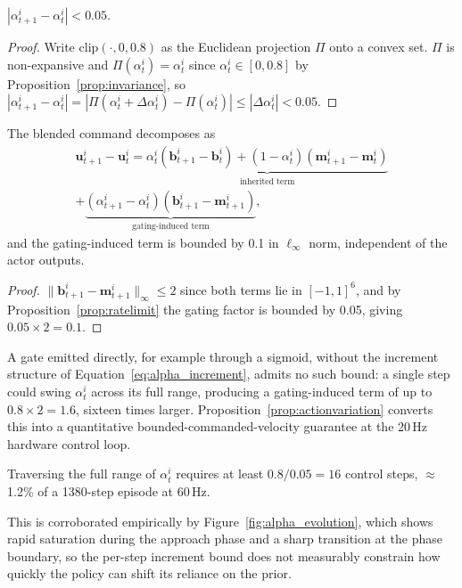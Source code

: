 \begin{proposition}\label{prop:ratelimit}
$|\alpha_{t+1}^i - \alpha_t^i| < 0.05$.
\end{proposition}
\begin{proof}
Write $\mathrm{clip}(\cdot,0,0.8)$ as the Euclidean projection $\Pi$ onto a convex set. $\Pi$ is
non-expansive and $\Pi(\alpha_t^i) = \alpha_t^i$ since $\alpha_t^i \in [0,0.8]$ by
Proposition~\ref{prop:invariance}, so $|\alpha_{t+1}^i - \alpha_t^i| = |\Pi(\alpha_t^i + \Delta\alpha_t^i) -
\Pi(\alpha_t^i)| \le |\Delta\alpha_t^i| < 0.05$.
\end{proof}

\begin{proposition}\label{prop:actionvariation}
The blended command decomposes as
\begin{multline}
\mathbf{u}_{t+1}^i - \mathbf{u}_t^i = \underbrace{\alpha_t^i(\mathbf{b}_{t+1}^i - \mathbf{b}_t^i) + (1-\alpha_t^i)(\mathbf{m}_{t+1}^i - \mathbf{m}_t^i)}_{\text{inherited term}} \\
+ \underbrace{(\alpha_{t+1}^i - \alpha_t^i)(\mathbf{b}_{t+1}^i - \mathbf{m}_{t+1}^i)}_{\text{gating-induced term}},
\label{eq:alpha_decomposition}
\end{multline}
and the gating-induced term is bounded by 0.1 in $\ell_\infty$ norm, independent of the actor outputs.
\end{proposition}
\begin{proof}
$\|\mathbf{b}_{t+1}^i - \mathbf{m}_{t+1}^i\|_\infty \le 2$ since both terms lie in $[-1,1]^6$, and by
Proposition~\ref{prop:ratelimit} the gating factor is bounded by 0.05, giving $0.05 \times 2 = 0.1$.
\end{proof}

A gate emitted directly, for example through a sigmoid, without the increment structure of
Equation~\eqref{eq:alpha_increment}, admits no such bound: a single step could swing $\alpha_t^i$ across its
full range, producing a gating-induced term of up to $0.8 \times 2 = 1.6$, sixteen times larger.
Proposition~\ref{prop:actionvariation} converts this into a quantitative bounded-commanded-velocity
guarantee at the 20\,Hz hardware control loop.

\begin{proposition}\label{prop:nonrestrictive}
Traversing the full range of $\alpha_t^i$ requires at least $0.8/0.05 = 16$ control steps,
$\approx$1.2\% of a 1380-step episode at 60\,Hz.
\end{proposition}
This is corroborated empirically by Figure~\ref{fig:alpha_evolution}, which shows rapid saturation
during the approach phase and a sharp transition at the phase boundary, so the per-step increment
bound does not measurably constrain how quickly the policy can shift its reliance on the prior.


